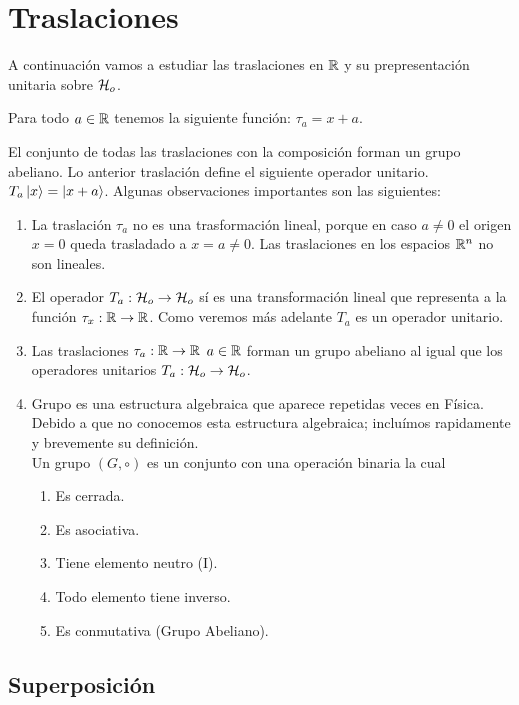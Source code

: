 \section{Traslaciones}
A continuación vamos a estudiar las traslaciones en $\mathbb{R}$ y su prepresentación unitaria sobre $\mathcal{H} _o$.
\begin{definition}
    Para todo $a \in \mathbb{R}$ tenemos la siguiente función: $\tau _a = x + a$.
\end{definition}
El conjunto de todas las traslaciones con la composición forman un grupo abeliano. Lo anterior traslación define el siguiente operador unitario. $T_a \ket{x} = \ket{x+a}$. Algunas observaciones importantes son las siguientes:
\begin{enumerate}
    \item La traslación $\tau _a$ no es una trasformación lineal, porque en caso $a\neq 0$ el origen $x = 0$ queda trasladado a $x = a \neq 0$. Las traslaciones en los espacios $\mathbb{R} ^n$ no son lineales.
    \item El operador $T_a : \mathcal{H} _o \to \mathcal{H} _o$ sí es una transformación lineal que representa a la función $\tau _x:\mathbb{R} \to \mathbb{R}$. Como veremos más adelante $T_a$ es un operador unitario.
    \item Las traslaciones $\tau _a : \mathbb{R} \to \mathbb{R}$ $a\in \mathbb{R}$ forman un grupo abeliano al igual que los operadores unitarios $T_a : \mathcal{H} _o \to \mathcal{H} _o$.
    \item Grupo es una estructura algebraica que aparece repetidas veces en Física. Debido a que no conocemos esta estructura algebraica; incluímos rapidamente y brevemente su definición. \\
    Un grupo $(G, \circ)$ es un conjunto con una operación binaria la cual
    \begin{enumerate}
        \item Es cerrada.
        \item Es asociativa.
        \item Tiene elemento neutro (I).
        \item Todo elemento tiene inverso.
        \item Es conmutativa (Grupo Abeliano).
    \end{enumerate}
\end{enumerate}

\subsection{Superposición}

